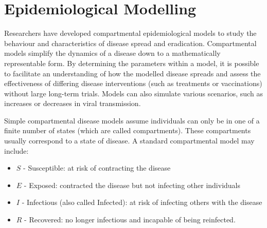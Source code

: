 \chapter{Epidemiological Modelling}

Researchers have developed compartmental epidemiological models to study the
behaviour and characteristics of disease spread and eradication. Compartmental
models simplify the dynamics of a disease down to a mathematically
representable form. By determining the parameters within a model,
it is possible to facilitate an understanding of
how the modelled disease spreads and assess the effectiveness of
differing disease interventions (such as treatments or vaccinations)
without large long-term trials. Models can also simulate various
scenarios, such as increases or decreases in viral transmission.

Simple compartmental disease models assume individuals can only be in one of
a finite number of states (which are called compartments). These compartments
usually correspond to a state of disease. A standard compartmental model may
include: \begin{itemize}
    \item $S$ - Susceptible: at risk of contracting the disease
    \item $E$ - Exposed: contracted the disease but not infecting other
          individuals
    \item $I$ - Infectious (also called Infected): at risk of infecting others
          with the disease
    \item $R$ - Recovered: no longer infectious and incapable of being reinfected.
\end{itemize}

